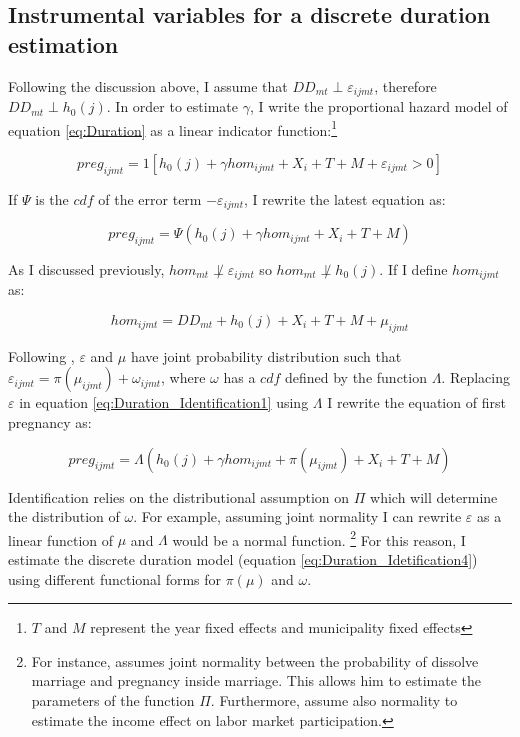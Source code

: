 \documentclass[a4paper,10pt,twocolumn,preprint,3p,authoryear]{elsarticle}
\begin{document}
\subsection{Instrumental variables for a discrete duration estimation}

Following the discussion above, I assume that  $DD_{mt}\perp\varepsilon_{ijmt}$, therefore $DD_{mt}\perp h_{0}\left(j\right)$. In order to estimate $\gamma$, I write the proportional hazard model of equation \ref{eq:Duration} as a linear indicator function:\footnote{$T$ and $M$ represent the year fixed effects and municipality fixed effects}

	\begin{equation}
		preg_{ijmt}=1\left[h_{0}\left(j\right)+\gamma hom_{ijmt}+X_{i}+T+M+\varepsilon_{ijmt}>0\right]\label{eq:Duration_Identification1}
	\end{equation}

If $\Psi$ is the $cdf$ of the error term $-\varepsilon_{ijmt}$, I rewrite the latest equation as:

	\begin{equation}
	  preg_{ijmt}=\Psi\left(h_{0}\left(j\right)+\gamma hom_{ijmt}+X_{i}+T+M\right)\label{eq:Duration_Identification2}
	\end{equation}

As I discussed previously, $hom_{mt}\not\perp\varepsilon_{ijmt}$ so $hom_{mt}\not\perp h_{0}\left(j\right)$. If I define $hom_{ijmt}$ as: 

	\begin{equation}
		hom_{ijmt} = DD_{mt}+h_{0}\left(j\right)+X_{i}+T+M+\mu_{ijmt}\label{eq:Duration_Identification3}
	\end{equation}

Following \citet{BlundellPowell2004}, $\varepsilon$ and $\mu$ have joint probability distribution such that $\varepsilon_{ijmt}=\pi\left(\mu_{ijmt}\right)+\omega_{ijmt}$, where $\omega$ has a $cdf$ defined by the function $\Lambda$.  Replacing $\varepsilon$ in equation \ref{eq:Duration_Identification1} using $\Lambda$ I rewrite the equation of first pregnancy as: 
 
	\begin{equation}
		preg_{ijmt}=\Lambda\left(h_{0}\left(j\right)+\gamma hom_{ijmt}+\pi\left(\mu_{ijmt}\right)+X_{i}+T+M\right)\label{eq:Duration_Idetification4}
	\end{equation}

Identification relies on the distributional assumption on $\Pi$ which will determine the distribution of $\omega$. For example, assuming joint normality I can rewrite $\varepsilon$ as a linear function of $\mu$ and $\Lambda$ would be a normal function. \footnote{For instance, \citet{Lillard1993} assumes joint normality between the probability of dissolve marriage and pregnancy inside marriage. This allows him to estimate the parameters of the function $\Pi$. Furthermore, \citet{BlundellPowell2004} assume also normality to estimate the income effect on labor market participation.} For this reason, I estimate the discrete duration model (equation \ref{eq:Duration_Idetification4}) using different functional forms for $\pi\left(\mu\right)$ and $\omega$.  
\end{document}

